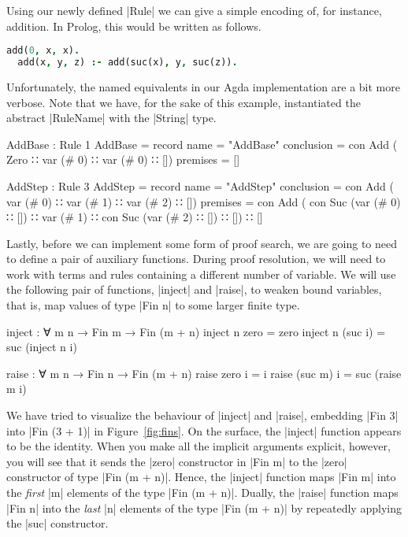 \documentclass[preprint]{sigplanconf}
\begin{document}
Using our newly defined |Rule| we can give a simple encoding of, for
instance, addition. In Prolog, this would be written as follows.

\begin{lstlisting}[language=Prolog]
  add(0, x, x).
  add(x, y, z) :- add(suc(x), y, suc(z)).
\end{lstlisting}

Unfortunately, the named equivalents in our Agda implementation are a
bit more verbose. Note that we have, for the sake of this example,
instantiated the abstract |RuleName| with the |String| type.

\begin{code}
AddBase : Rule 1
AddBase = record {
  name        = "AddBase"
  conclusion  = con Add  (  Zero
                         ∷  var (# 0)
                         ∷  var (# 0)
                         ∷ [])
  premises    = []
  }
\end{code}

\begin{code}
AddStep : Rule 3
AddStep = record {
  name        = "AddStep"
  conclusion  =  con Add  (  var (# 0)
                          ∷  var (# 1)
                          ∷  var (# 2)
                          ∷ [])
  premises    =  con Add  (  con Suc (var (# 0) ∷ [])
                          ∷  var (# 1)
                          ∷  con Suc (var (# 2) ∷ [])
                          ∷ [])
                 ∷ []
  }
\end{code}

Lastly, before we can implement some form of proof search, we are
going to need to define a pair of auxiliary functions. During proof
resolution, we will need to work with terms and rules containing a
different number of variable. We will use the following pair of
functions, |inject| and |raise|, to weaken bound variables, that is,
map values of type |Fin n| to some larger finite type.
\begin{code}
  inject : ∀ {m} n → Fin m → Fin (m + n)
  inject n  zero    = zero
  inject n (suc i)  = suc (inject n i)

  raise : ∀ m {n} → Fin n → Fin (m + n)
  raise  zero   i  = i
  raise (suc m) i  = suc (raise m i)
\end{code}
We have tried to visualize the behaviour of |inject| and |raise|,
embedding |Fin 3| into |Fin (3 + 1)| in Figure~\ref{fig:fins}. On the
surface, the |inject| function appears to be the identity. When you
make all the implicit arguments explicit, however, you will see that
it sends the |zero| constructor in |Fin m| to the |zero| constructor
of type |Fin (m + n)|. Hence, the |inject| function maps |Fin m| into the
\emph{first} |m| elements of the type |Fin (m + n)|. Dually, the
|raise| function maps |Fin n| into the \emph{last} |n| elements of the
type |Fin (m + n)| by repeatedly applying the |suc| constructor.
\end{document}
